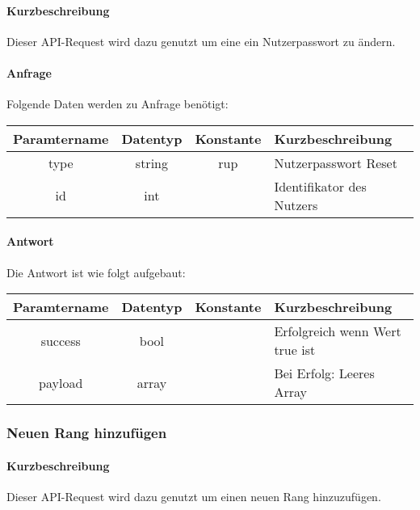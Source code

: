 \paragraph{Kurzbeschreibung}Dieser API-Request wird dazu genutzt um eine ein Nutzerpasswort zu ändern.
\paragraph{Anfrage}Folgende Daten werden zu Anfrage benötigt:
\begin{table}[H]
	\begin{tabular}{|c|c|c|p{6.5cm}|}
		\hline
		\textbf{Paramtername} & \textbf{Datentyp} & \textbf{Konstante} & \textbf{Kurzbeschreibung}                                                                                               \\ \hline
		type                & string            & rup                & Nutzerpasswort Reset \\ \hline
		id                  & int               &                    & Identifikator des Nutzers \\ \hline
	\end{tabular}
\end{table}
\paragraph{Antwort}Die Antwort ist wie folgt aufgebaut:
\begin{table}[H]
	\begin{tabular}{|c|c|c|p{6.5cm}|}
		\hline
		\textbf{Paramtername} & \textbf{Datentyp} & \textbf{Konstante} & \textbf{Kurzbeschreibung}            \\ \hline                
		success             & bool             &                 & Erfolgreich wenn Wert {\glqq true\grqq} ist \\ \hline
		payload             & array            &                 & Bei Erfolg: Leeres Array \\ \hline
	\end{tabular}
\end{table}
\subsubsection{Neuen Rang hinzufügen}
\paragraph{Kurzbeschreibung}Dieser API-Request wird dazu genutzt um einen neuen Rang hinzuzufügen.
